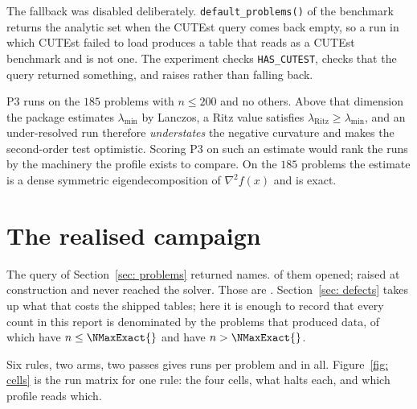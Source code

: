 \documentclass[11pt,a4paper]{article}
\theoremstyle{remark}
\begin{document}
The fallback was disabled deliberately. \texttt{default\_problems()} of the
benchmark returns the analytic set when the CUTEst query comes back empty, so a
run in which CUTEst failed to load produces a table that reads as a CUTEst
benchmark and is not one. The experiment checks \texttt{HAS\_CUTEST}, checks that
the query returned something, and raises rather than falling back.

P3 runs on the $185$ problems with $n \leq 200$ and no others. Above that
dimension the package estimates $\lambda_{\min}$ by Lanczos, a Ritz value
satisfies $\lambda_{\text{Ritz}} \geq \lambda_{\min}$, and an under-resolved run
therefore \emph{understates} the negative curvature and makes the second-order
test optimistic. Scoring P3 on such an estimate would rank the runs by the
machinery the profile exists to compare. On the $185$ problems the estimate is a
dense symmetric eigendecomposition of $\nabla^2 f(x)$ and is exact.

\section{The realised campaign}\label{sec: realised}

The query of Section~\ref{sec: problems} returned \NListed{} names. \NOpened{} of
them opened; \NNeverOp{} raised at construction and never reached the solver.
Those \NNeverOp{} are \NeverOpened{}. Section~\ref{sec: defects} takes up what
that costs the shipped tables; here it is enough to record that every count in
this report is denominated by the \NOpened{} problems that produced data, of which
\NSmall{} have $n \leq \NMaxExact{}$ and \NBig{} have $n > \NMaxExact{}$.

Six rules, two arms, two passes gives \NRunsPerProblem{} runs per problem and
\NRuns{} in all. Figure~\ref{fig: cells} is the run matrix for one rule: the
four cells, what halts each, and which profile reads which.
\end{document}
